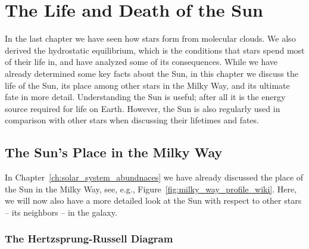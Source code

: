
\chapter{The Life and Death of the Sun}\label{ch:sun}

In the last chapter we have seen how stars form from molecular clouds. We also derived the hydrostatic equilibrium, which is the conditions that stars spend most of their life in, and have analyzed some of its consequences. While we have already determined some key facts about the Sun, in this chapter we discuss the life of the Sun, its place among other stars in the Milky Way, and its ultimate fate in more detail. Understanding the Sun is useful; after all it is the energy source required for life on Earth. However, the Sun is also regularly used in comparison with other stars when discussing their lifetimes and fates.

\section{The Sun's Place in the Milky Way}

In Chapter~\ref{ch:solar_system_abundnaces} we have already discussed the place of the Sun in the Milky Way, see, e.g., Figure~\ref{fig:milky_way_profile_wiki}. Here, we will now also have a more detailed look at the Sun with respect to other stars -- its neighbors -- in the galaxy.

\subsection{The Hertzsprung-Russell Diagram}

